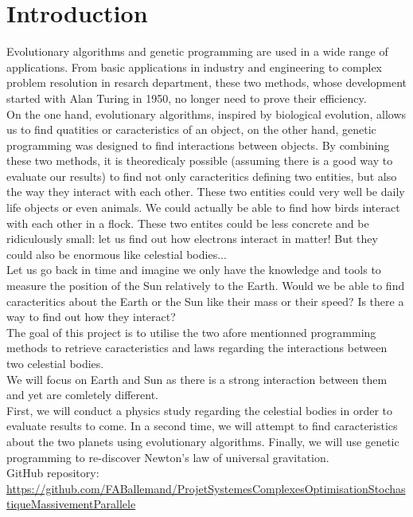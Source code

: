 \section{Introduction}
Evolutionary algorithms and genetic programming are used in a wide range of
applications. From basic applications in industry and engineering to complex
problem resolution in resarch department, these two methods, whose development
started with Alan Turing in 1950, no longer need to prove their efficiency.\\


On the one hand, evolutionary algorithms, inspired by biological evolution,
allows us to find quatities or caracteristics of an object, on the other
hand, genetic programming was designed to find interactions between objects. By
combining these two methods, it is theoredicaly possible (assuming there is a
good way to evaluate our results) to find not only caracteritics defining two
entities, but also the way they interact with each other.
These two entities could very well be daily life objects or even animals. We
could actually be able to find how birds interact with each other in a flock.
These two entites could be less concrete and be ridiculously small: let us find
out how electrons interact in matter! But they could also be enormous like
celestial bodies...\\

Let us go back in time and imagine we only have the knowledge and tools to
measure the position of the Sun relatively to the Earth. Would we be able to
find caracteritics about the Earth or the Sun like their mass or their speed?
Is there a way to find out how they interact?\\

The goal of this project is to utilise the two afore mentionned programming
methods to retrieve caracteristics and laws regarding the interactions between
two celestial bodies.\\
We will focus on Earth and Sun as there is a strong interaction between them
and yet are comletely different.\\
First, we will conduct a physics study regarding the celestial bodies in order
to evaluate results to come.
In a second time, we will attempt to find caracteristics about the two planets using
evolutionary algorithms. Finally, we will use genetic programming to
re-discover Newton's law of universal gravitation.\\


GitHub repository: \url{https://github.com/FABallemand/ProjetSystemesComplexesOptimisationStochastiqueMassivementParallele}